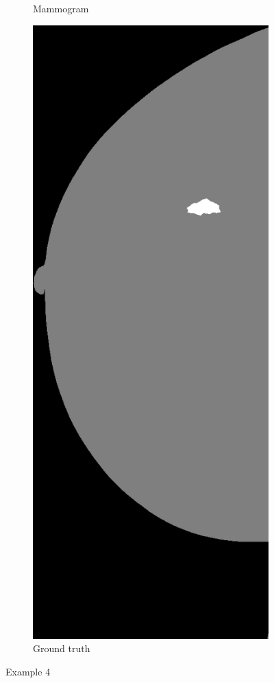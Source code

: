 \begin{figure}[h]
\begin{subfigure}{0.2\textwidth}
         \caption{Mammogram}
	\end{subfigure}
	\quad
	\begin{subfigure}{0.2\textwidth}
		\centering
			\includegraphics[width=\textwidth]{plots/examples/label_4.png}
         \caption{Ground truth}
	\end{subfigure}
	\caption[Example 4]{Example 4}
\end{figure}


